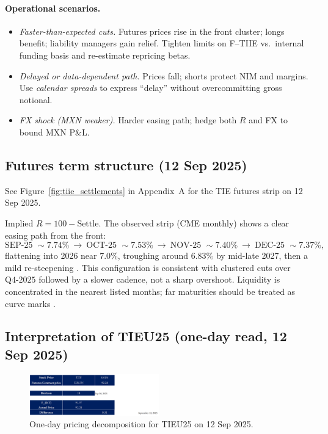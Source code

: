 \documentclass[11pt,a4paper]{article} %
\begin{document}
\paragraph{Operational scenarios.}
\begin{itemize}
  \item \textit{Faster-than-expected cuts.} Futures prices rise in the front cluster; longs benefit; liability managers gain relief. Tighten limits on F--TIIE vs.\ internal funding basis and re-estimate repricing betas.
  \item \textit{Delayed or data-dependent path.} Prices fall; shorts protect NIM and margins. Use \emph{calendar spreads} to express “delay” without overcommitting gross notional.
  \item \textit{FX shock (MXN weaker).} Harder easing path; hedge both $R$ and FX to bound MXN P\&L.
\end{itemize}



\subsection{Futures term structure (12 Sep 2025)}

See Figure~\ref{fig:tiie_settlements} in Appendix~A for the TIE futures strip on 12 Sep 2025.

\(\text{Implied }R = 100 - \text{Settle}\). The observed strip (CME monthly) shows a clear easing path from the front:
\[
\text{SEP-25 } \sim {7.74\%}\ \to\ \text{OCT-25 } \sim {7.53\%}\ \to\ \text{NOV-25 } \sim {7.40\%}\ \to\ \text{DEC-25 } \sim {7.37\%},
\]
flattening into 2026 near \(7.0\%\), troughing around \(6.83\%\) by mid-late 2027, then a mild re-steepening \citep{cme_tiie_monthly_quotes}. This configuration is consistent with clustered cuts over \(\text{Q4-2025}\) followed by a slower cadence, not a sharp overshoot. Liquidity is concentrated in the nearest listed months; far maturities should be treated as curve marks \citep{cme_tiie_monthly_overview,cme_tiie_monthly_quotes}.

\subsection{Interpretation of \texorpdfstring{TIEU25}{TIEU25} (one-day read, 12 Sep 2025)}

\begin{figure}[h]
  \centering
  \includegraphics[width=0.5\textwidth]{figures/tiie.png}
 \caption{One-day pricing decomposition for TIEU25 on 12 Sep 2025.}
\end{figure}
\end{document}
